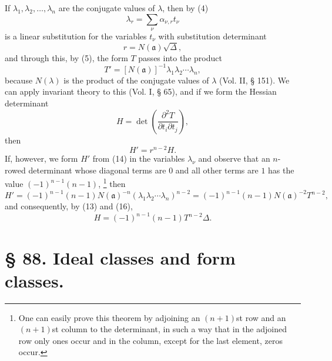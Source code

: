 \documentclass[11pt]{article}
\begin{document}
If $\lambda_1,\lambda_2,
\ldots,\lambda_n$ are the conjugate values of $\lambda$, then by (4)
\begin{equation}
 \lambda_r=\sum_\nu\alpha_{\nu,r}t_\nu\tag{12}
\end{equation}
is a linear substitution for the variables $t_\nu$ with substitution determinant
\begin{equation}
 r=N(\mathfrak a)\sqrt{\Delta},\tag{13}
\end{equation}
and through this, by (5), the form $T$ passes into the product
\begin{equation}
 T'=[N(\mathfrak a)]^{-1}\lambda_1\lambda_2\cdots\lambda_n,\tag{14}
\end{equation}
because $N(\lambda)$ is the product of the conjugate values of $\lambda$ (Vol. II, § 151). We can apply invariant theory to this (Vol. I, § 65), and if we form the Hessian determinant
\begin{equation}
 H=\det\left(\frac{\partial^2T}{\partial t_i\partial t_j}\right),\tag{15}
\end{equation}
then
\begin{equation}
 H'=r^{n-2}H.\tag{16}
\end{equation}
If, however, we form $H'$ from (14) in the variables $\lambda_\nu$ and observe that an $n$-rowed determinant whose diagonal terms are $0$ and all other terms are $1$ has the value $(-1)^{n-1}(n-1)$,
\footnote{One can easily prove this theorem by adjoining an $(n+1)$st row and an $(n+1)$st column to the determinant, in such a way that in the adjoined row only ones occur and in the column, except for the last element, zeros occur.}
then
\[
 H'=(-1)^{n-1}(n-1)N(\mathfrak a)^{-n}(\lambda_1\lambda_2\cdots\lambda_n)^{n-2}
 =(-1)^{n-1}(n-1)N(\mathfrak a)^{-2}T^{n-2},
\]
and consequently, by (13) and (16),
\begin{equation}
 H=(-1)^{n-1}(n-1)T^{n-2}\Delta.\tag{17}
\end{equation}

\section*{§ 88. Ideal classes and form classes.}
\end{document}
